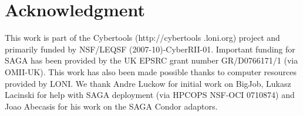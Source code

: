 \documentclass[conference,final]{IEEEtran}
\begin{document}
\section*{Acknowledgment}
This work is part of the Cybertools (http://cybertools .loni.org)
project and primarily funded by NSF/LEQSF (2007-10)-CyberRII-01.
Important funding for SAGA has been provided by the UK EPSRC grant
number GR/D0766171/1 (via OMII-UK). This work has also been made
possible thanks to computer resources provided by LONI. We thank Andre
Luckow for initial work on BigJob, Lukasz Lacinski for help with SAGA
deployment (via HPCOPS NSF-OCI 0710874) and Joao Abecasis for his work
on the SAGA Condor adaptors.

\nocite{ex1,ex2}
%


\end{document}
